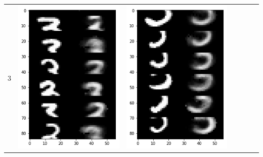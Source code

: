 \documentclass[12pt]{report} %
\begin{document}
\begin{tabular}{m{0.7cm}m{2.4cm}m{2.4cm}m{2.4cm}m{2.4cm}m{2.4cm}m{2.4cm}}
	3 & \includegraphics[scale=0.3]{pictures/KE_3_up.png} & \includegraphics[scale=0.3]{pictures/KE_3_down.png} &

\end{tabular}
\end{document}
